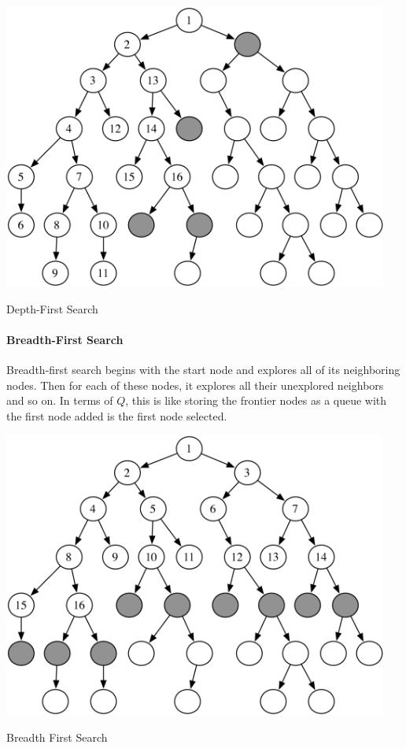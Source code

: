 \begin{marginfigure}
\begin{center}
\includegraphics[width=0.95\textwidth]{tex/figs/ch05_figs/depth_first.PNG}
\caption{Depth-First Search}
\end{center}
\end{marginfigure}

\paragraph{Breadth-First Search}
Breadth-first search begins with the start node and explores all of its neighboring nodes. Then for each of these nodes, it explores all their unexplored neighbors and so on. In terms of $Q$, this is like storing the frontier nodes as a queue with the first node added is the first node selected.

\begin{marginfigure}
\begin{center}
\includegraphics[width=0.95\textwidth]{tex/figs/ch05_figs/breadth_first.PNG}
\caption{Breadth First Search}
\end{center}
\end{marginfigure}

